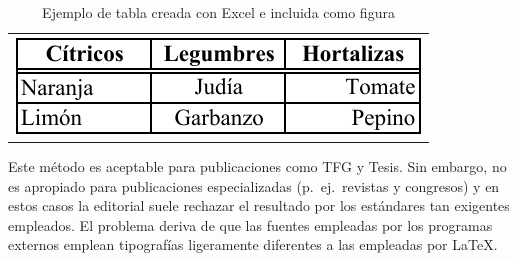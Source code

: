 \documentclass[11pt,a4paper]{article}
\begin{document}
\begin{table}[H]%
	\centering
	\caption[Tabla \textsf{Excel}]{Ejemplo de tabla creada con \textsf{Excel} e incluida como figura}
	\label{tab:figura}
	\begin{tabular}{c}
		\includegraphics{../figs/alimentos}
	\end{tabular}
\end{table}

Este método es aceptable para publicaciones como TFG y Tesis. Sin embargo, no es apropiado para publicaciones especializadas (p.~ej.\ revistas y congresos) y en estos casos la editorial suele rechazar el resultado por los estándares tan exigentes empleados. El problema deriva de que las fuentes empleadas por los programas externos emplean tipografías ligeramente diferentes a las empleadas por \LaTeX.
\end{document}
